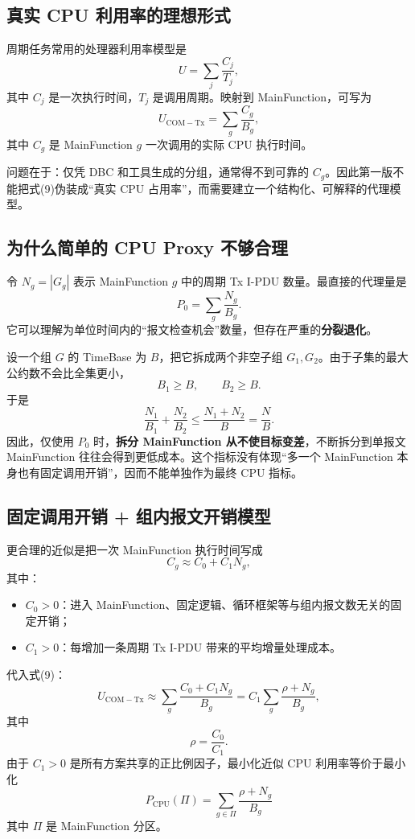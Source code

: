 \documentclass[11pt,a4paper,fontset=none]{ctexart}
\begin{document}
\subsection{真实 CPU 利用率的理想形式}

周期任务常用的处理器利用率模型是
\[
U=\sum_j\frac{C_j}{T_j},
\tag{8}
\]
其中 $C_j$ 是一次执行时间，$T_j$ 是调用周期\cite{liu_layland}。映射到 MainFunction，可写为
\[
U_{\mathrm{COM-Tx}}
=\sum_{g}\frac{C_g}{B_g},
\tag{9}
\]
其中 $C_g$ 是 MainFunction $g$ 一次调用的实际 CPU 执行时间。

问题在于：仅凭 DBC 和工具生成的分组，通常得不到可靠的 $C_g$。因此第一版不能把式(9)伪装成“真实 CPU 占用率”，而需要建立一个结构化、可解释的代理模型。

\subsection{为什么简单的 CPU Proxy 不够合理}

令 $N_g=|G_g|$ 表示 MainFunction $g$ 中的周期 Tx I-PDU 数量。最直接的代理量是
\[
P_0=\sum_g\frac{N_g}{B_g}.
\tag{10}
\]
它可以理解为单位时间内的“报文检查机会”数量，但存在严重的\textbf{分裂退化}。

设一个组 $G$ 的 TimeBase 为 $B$，把它拆成两个非空子组 $G_1,G_2$。由于子集的最大公约数不会比全集更小，
\[
B_1\ge B,\qquad B_2\ge B.
\tag{11}
\]
于是
\[
\frac{N_1}{B_1}+\frac{N_2}{B_2}
\le
\frac{N_1+N_2}{B}
=\frac{N}{B}.
\tag{12}
\]
因此，仅使用 $P_0$ 时，\textbf{拆分 MainFunction 从不使目标变差}，不断拆分到单报文 MainFunction 往往会得到更低成本。这个指标没有体现“多一个 MainFunction 本身也有固定调用开销”，因而不能单独作为最终 CPU 指标。

\subsection{固定调用开销 + 组内报文开销模型}

更合理的近似是把一次 MainFunction 执行时间写成
\[
C_g\approx C_0+C_1N_g,
\tag{13}
\]
其中：
\begin{itemize}
  \item $C_0>0$：进入 MainFunction、固定逻辑、循环框架等与组内报文数无关的固定开销；
  \item $C_1>0$：每增加一条周期 Tx I-PDU 带来的平均增量处理成本。
\end{itemize}

代入式(9)：
\[
U_{\mathrm{COM-Tx}}
\approx
\sum_g\frac{C_0+C_1N_g}{B_g}
=C_1\sum_g\frac{\rho+N_g}{B_g},
\tag{14}
\]
其中
\[
\rho=\frac{C_0}{C_1}.
\tag{15}
\]
由于 $C_1>0$ 是所有方案共享的正比例因子，最小化近似 CPU 利用率等价于最小化
\[
\boxed{
P_{\mathrm{CPU}}(\Pi)
=\sum_{g\in\Pi}\frac{\rho+N_g}{B_g}
}
\tag{16}
\]
其中 $\Pi$ 是 MainFunction 分区。
\end{document}
